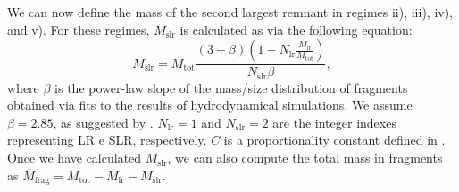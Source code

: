 \documentclass[fleqn,usenatbib]{mnras}
\begin{document}
 We can now define the mass of the second largest remnant in regimes ii), iii), iv), and v). For these regimes, $M_{\text{slr}}$ is calculated as \cite{leinhardt2012} via the following equation: 
\begin{equation}
    M_{\text{slr}} = M_{\text{tot}}\frac{(3- \beta )\left (1-N_{\text{lr}}\frac{M_{\text{lr}}}{M_{\text{tot}}}  \right )}{N_{\text{slr}}\beta },
\label{eq:slr}
\end{equation}
\noindent where $\beta$ is the power-law slope of the mass/size distribution of fragments obtained via fits to the results of hydrodynamical simulations. We assume $\beta = 2.85$, as suggested by \cite{leinhardt2012}. $N_{\text{lr}} = 1$ and $N_{\text{slr}} = 2$ are the integer indexes representing LR e SLR, respectively. $C$ is a proportionality constant defined in \cite{leinhardt2012}. Once we have calculated $M_{\text{slr}}$, we can also compute the total mass in fragments as $M_{\text{frag}} = M_{\text{tot}}-M_{\text{lr}}-M_{\text{slr}}$.
\end{document}

